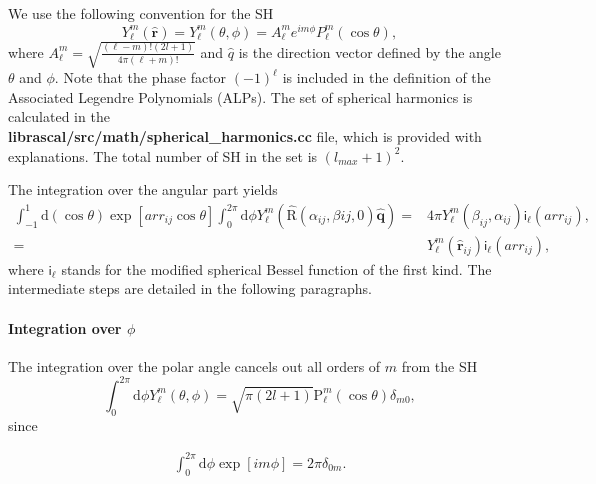 \documentclass[
journal=jctcce, %
manuscript=article, layout=onecolumn]{achemso}
\begin{document}
We use the following convention for the SH
\begin{equation}
    Y_{\ell}^{m}\left(\hat{\mathbf{r}}\right)=Y_{\ell}^{m}\left(\theta,\phi\right)=A_{\ell}^{m}e^{im\phi}P^{m}_{\ell}\left(\cos\theta\right),
\end{equation}
where $A_{\ell}^{m} =\sqrt{\frac{(\ell-m)!(2l+1)}{4\pi(\ell+m)!}}$
and $\hat{q}$ is the direction vector defined by the angle $\theta$ and $\phi$. Note that the phase factor $(-1)^\ell$ is included in the definition of the Associated Legendre Polynomials (ALPs). The set of spherical harmonics is calculated in the \\ \textbf{librascal/src/math/spherical\_harmonics.cc} file, which is provided with explanations. The total number of SH in the set is $(l_{max} +1)^2$.


The integration over the angular part yields
\begin{equation}
\begin{split}
\int_{-1}^{1}\mathrm{d}\left(\cos{\theta}\right) \exp\left[arr_{ij}\cos{\theta}\right] \int_0^{2\pi}\mathrm{d}\phi Y_{\ell}^{m}\left(\hat{\mathrm{R}}\left(\alpha_{ij},\beta{ij},0\right)\hat{\bm{q}}\right) =& 4\pi Y_\ell^m \left(\beta_{ij},\alpha_{ij}\right) \mathsf{i}_{\ell}\left(arr_{ij}\right), \\
=& Y_\ell^m \left(\hat{\mathbf{r}}_{ij}\right) \mathsf{i}_{\ell}\left(arr_{ij}\right),
\end{split}
\end{equation}
where $\mathsf{i}_{\ell}$ stands for the modified spherical Bessel function of the first kind. The intermediate steps are detailed in the following paragraphs.

\paragraph{Integration over $\phi$}


The integration over the polar angle cancels out all orders of $m$ from the SH
\begin{equation}
\int_0^{2\pi}\mathrm{d}\phi Y_{\ell}^{m}\left(\theta,\phi\right) = \sqrt{\pi\left(2l+1\right)}\mathrm{P}_{\ell}^{m}\left(\cos{\theta}\right) \delta_{m0},
\end{equation}
since 


\begin{equation}
\begin{split}
\int_0^{2\pi}\mathrm{d}\phi \exp\left[im\phi\right] = 2\pi \delta_{0m}.
\end{split}
\end{equation}
\end{document}
